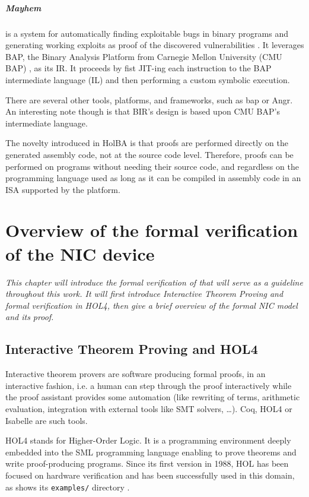 \documentclass{kththesis}
\begin{document}
\paragraph{Mayhem} is a system for automatically finding exploitable bugs in binary programs and generating working exploits as proof of the discovered vulnerabilities \cite{cha_unleashing_2012}. It leverages BAP, the Binary Analysis Platform from Carnegie Mellon University (CMU BAP) \cite{brumley_bap:_2011}, as its IR. It proceeds by fist JIT-ing each instruction to the BAP intermediate language (IL) and then performing a custom symbolic execution.

There are several other tools, platforms, and frameworks, such as \gls{bap} \cite{noauthor_binary_2019} or Angr. An interesting note though is that BIR's design is based upon CMU BAP's intermediate language.

The novelty introduced in HolBA is that proofs are performed directly on the generated assembly code, not at the source code level. Therefore, proofs can be performed on programs without needing their source code, and regardless on the programming language used as long as it can be compiled in assembly code in an \gls{ISA} supported by the platform.


\chapter{Overview of the formal verification of the NIC device} \label{chapter-overview-nic}
\vspace{-1cm}
\textit{This chapter will introduce the formal verification of \cite{haglund_formal_2016} that will serve as a guideline throughout this work. It will first introduce Interactive Theorem Proving and formal verification in HOL4, then give a brief overview of the formal NIC model and its proof.}

\section{Interactive Theorem Proving and HOL4} \label{hol4-presentation}

Interactive theorem provers are software producing formal proofs, in an
interactive fashion, i.e. a human can step through the proof interactively while the proof assistant provides some automation (like rewriting of terms, arithmetic evaluation, integration with external tools like SMT solvers, \dots). Coq, HOL4 or Isabelle are such tools.

HOL4 \cite{noauthor_hol_nodate} stands for Higher-Order Logic. It is a programming environment deeply embedded into the \gls{SML} programming language enabling to prove theorems and write \gls{proof-producing} programs. Since its first version in 1988, HOL has been focused on hardware verification and has been successfully used in this domain, as shows its \texttt{examples/} directory \cite{noauthor_canonical_2019}.
\end{document}
